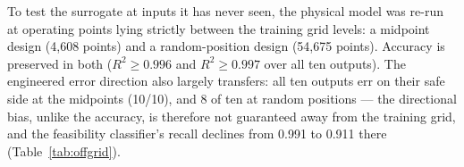 To test the surrogate at inputs it has never seen, the physical model was
re-run at operating points lying strictly between the training grid levels:
a midpoint design (4,608 points) and a random-position design
(54,675 points). Accuracy is preserved in both
($R^2 \geq 0.996$ and $R^2 \geq 0.997$ over all ten
outputs). The engineered error direction also largely transfers: all ten
outputs err on their safe side at the midpoints
(10/10), and
8 of ten at random positions --- the
directional bias, unlike the accuracy, is therefore not guaranteed away from
the training grid, and the feasibility classifier's recall declines from
0.991 to 0.911 there
(Table~\ref{tab:offgrid}).
